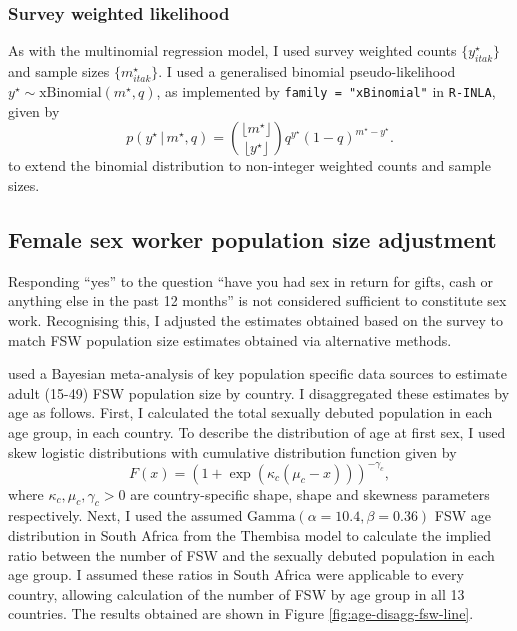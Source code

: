 \documentclass[a4paper, nobind]{templates/ociamthesis}
\begin{document}
\hypertarget{survey-weighted-likelihood-1}{%
\subsubsection{Survey weighted likelihood}\label{survey-weighted-likelihood-1}}

As with the multinomial regression model, I used survey weighted counts \(\{y_{itak}^\star\}\) and sample sizes \(\{m_{itak}^\star\}\).
I used a generalised binomial pseudo-likelihood \(y^\star \sim \text{xBinomial}(m^\star, q)\), as implemented by \texttt{family = "xBinomial"} in \texttt{R-INLA}, given by
\begin{equation}
    p(y^\star \, | \, m^\star, q) =  \binom{\lfloor m^\star \rfloor}{\lfloor y^\star \rfloor} q^{y^\star} (1 - q)^{m^\star - y^\star}.
\end{equation}
to extend the binomial distribution to non-integer weighted counts and sample sizes.

\hypertarget{female-sex-worker-population-size-adjustment}{%
\subsection{Female sex worker population size adjustment}\label{female-sex-worker-population-size-adjustment}}

Responding ``yes'' to the question ``have you had sex in return for gifts, cash or anything else in the past 12 months'' is not considered sufficient to constitute sex work.
Recognising this, I adjusted the estimates obtained based on the survey to match FSW population size estimates obtained via alternative methods.

\textcite{stevens2022estimating} used a Bayesian meta-analysis of key population specific data sources to estimate adult (15-49) FSW population size by country.
I disaggregated these estimates by age as follows.
First, I calculated the total sexually debuted population in each age group, in each country.
To describe the distribution of age at first sex, I used skew logistic distributions \autocite{nguyen2022trends} with cumulative distribution function given by
\begin{equation}
F(x) = \left(1 + \exp(\kappa_c (\mu_c - x)) \right)^{- \gamma_c},
\end{equation}
where \(\kappa_c, \mu_c, \gamma_c > 0\) are country-specific shape, shape and skewness parameters respectively.
Next, I used the assumed \(\text{Gamma}(\alpha = 10.4, \beta = 0.36)\) FSW age distribution in South Africa from the Thembisa model \autocite{johnson2020thembisa} to calculate the implied ratio between the number of FSW and the sexually debuted population in each age group.
I assumed these ratios in South Africa were applicable to every country, allowing calculation of the number of FSW by age group in all 13 countries.
The results obtained are shown in Figure \ref{fig:age-disagg-fsw-line}.
\end{document}
